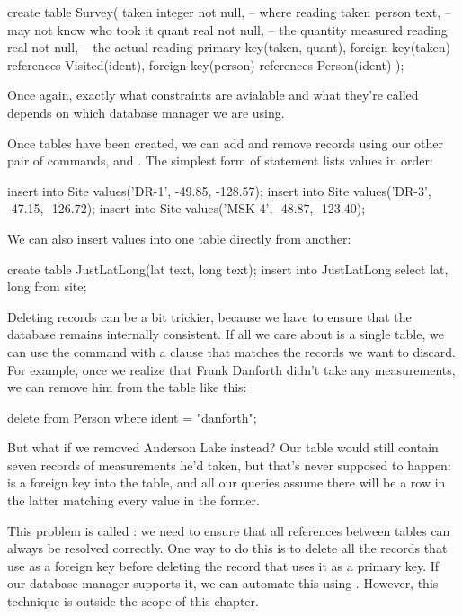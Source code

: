 \begin{VerbIn}
create table Survey(
    taken   integer not null, -- where reading taken
    person  text,             -- may not know who took it
    quant   real not null,    -- the quantity measured
    reading real not null,    -- the actual reading
    primary key(taken, quant),
    foreign key(taken) references Visited(ident),
    foreign key(person) references Person(ident)
);
\end{VerbIn}

Once again, exactly what constraints are avialable and what they're
called depends on which database manager we are using.

Once tables have been created, we can add and remove records using our
other pair of commands,  and . The
simplest form of  statement lists values in order:

\begin{VerbIn}
insert into Site values('DR-1', -49.85, -128.57);
insert into Site values('DR-3', -47.15, -126.72);
insert into Site values('MSK-4', -48.87, -123.40);
\end{VerbIn}

We can also insert values into one table directly from another:

\begin{VerbIn}
create table JustLatLong(lat text, long text);
insert into JustLatLong select lat, long from site;
\end{VerbIn}

Deleting records can be a bit trickier, because we have to ensure that
the database remains internally consistent. If all we care about is a
single table, we can use the  command with a
 clause that matches the records we want to discard. For
example, once we realize that Frank Danforth didn't take any
measurements, we can remove him from the  table like
this:

\begin{VerbIn}
delete from Person where ident = "danforth";
\end{VerbIn}

But what if we removed Anderson Lake instead? Our  table
would still contain seven records of measurements he'd taken, but that's
never supposed to happen:  is a foreign key into
the  table, and all our queries assume there will be a
row in the latter matching every value in the former.

This problem is called : we need to ensure that all references between tables can
always be resolved correctly. One way to do this is to delete all the
records that use  as a foreign key before deleting the
record that uses it as a primary key. If our database manager supports
it, we can automate this using . However, this technique is outside the scope of this chapter.

